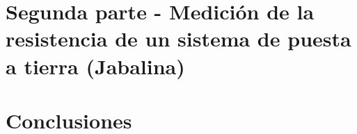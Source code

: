 \documentclass[12pt, letterpaper]{article}
\begin{document}
	
	\section{Segunda parte - Medición de la resistencia de un sistema de puesta a tierra (Jabalina)}

\section{Conclusiones}




\label{LastPage}
\end{document}

